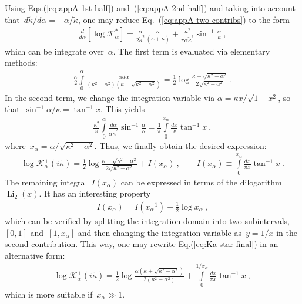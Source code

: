 \documentclass[preprint,aps,eqsecnum, prb]{revtex4-1}
\newcommand{\fplus}[1]{{#1}^{+}}
\begin{document}
Using Eqs.(\ref{eq:appA-1st-half}) and~(\ref{eq:appA-2nd-half})
and taking into account
that~$d{\tilde \kappa}/{d\alpha} =  - \alpha/{\tilde\kappa}$,
one may reduce Eq.~(\ref{eq:appA-two-contribs}) to the form
\begin{align}
  \frac{d}{d\alpha} [\log \mathcal{K}_\alpha^\ast] =
  \frac{\alpha}{2{\tilde\kappa}^2} \frac{\kappa}{(\kappa + {\tilde\kappa})}
  + \frac{\kappa^2}{\pi\alpha{\tilde\kappa}^2} \sin^{-1}\frac{\alpha}{\kappa}
  \  ,
\end{align}
which can be integrate over~$\alpha$.
The first term is evaluated via elementary methods:
\begin{align}
  \frac{\kappa}{2} \int\limits_{0}^{\alpha}
  \frac{\alpha d\alpha}{(\kappa^2 - \alpha^2)
  (\kappa + \sqrt{\kappa^2 - \alpha^2})}
  = \frac{1}{2} \log\frac{\kappa + \sqrt{\kappa^2 - \alpha^2}}{
    2\sqrt{\kappa^2 - \alpha^2}}\ .
\end{align}
In the second term, we change the integration variable via
$\alpha = \kappa x / \sqrt{1 + x^2}$,
so that~$\sin^{-1} \alpha/\kappa = \tan^{-1} x$. This yields
\begin{align}
  \frac{\kappa^2}{\pi} \int\limits_{0}^{\alpha}
  \frac{d\alpha}{\alpha{\tilde\kappa}^2} \sin^{-1}\frac{\alpha}{\kappa}
  = \frac{1}{\pi} \int\limits_{0}^{x_\alpha} \frac{dx}{x} \tan^{-1} x\ ,
\end{align}
where~$x_\alpha = \alpha/\sqrt{\kappa^2 - \alpha^2}$.
Thus, we finally obtain the desired expression:
\begin{align}
  \label{eq:Ka-star-final}
  \log \fplus{\mathcal{K}}_\alpha(i{\tilde \kappa})
  = \frac{1}{2}\log\frac{\kappa + \sqrt{\kappa^2 - \alpha^2}}{
  2\sqrt{\kappa^2 - \alpha^2}}
  + I(x_\alpha)\ , \qquad
  I(x_\alpha) \equiv \int\limits_{0}^{x_\alpha}\frac{dx}{\pi x} \tan^{-1} x\ .
\end{align}
The remaining integral~$I(x_\alpha)$
can be expressed in terms of the dilogarithm
$\mathop{\mathrm{Li}}_2(x)$. It has an interesting property
\begin{align}
I(x_\alpha) = I(x_\alpha^{-1}) + \frac{1}{2} \log{x_\alpha}\ ,
\end{align}
which can be verified by splitting the integration domain
into two subintervals,~$[0, 1]$ and~$[1, x_\alpha]$ and
then changing the integration variable as~$y = 1/x$ in the
second contribution. This way, one may rewrite Eq.(\ref{eq:Ka-star-final})
in an alternative form:
\begin{align}
  \label{eq:Ka-star-alt}
  \log \fplus{\mathcal{K}}_\alpha(i{\tilde \kappa})
  = \frac{1}{2}\log\frac{
  \alpha(\kappa + \sqrt{\kappa^2 - \alpha^2})}{
   2(\kappa^2 - \alpha^2)}
  + \int\limits_{0}^{1/x_\alpha}\frac{dx}{\pi x} \tan^{-1} x\ ,
\end{align}
which is more suitable if~$x_\alpha \gg 1$.
\end{document}
